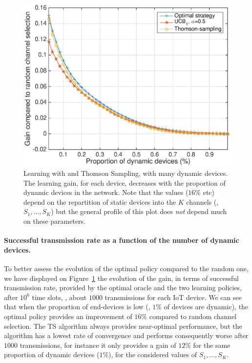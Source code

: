 \begin{figure}[!h]
    \centering
    \includegraphics[scale=0.80]{perf_learning.eps}
    \caption{Learning with \UCB{} and Thomson Sampling, with many dynamic devices.
        The learning gain, for each device, decreases with the proportion of dynamic devices in the network.
        Note that the values ($16\%$ etc) depend on the repartition of static devices into the $K$ channels (\ie, $S_1,\dots,S_K$) but the general profile of this plot does \emph{not} depend much on these parameters.
    }
    \label{fig:41:perf_learning}
\end{figure}


\paragraph{Successful transmission rate as a function of the number of dynamic devices.}
%
To better assess the evolution of the optimal policy compared to the random one, we have displayed on Figure~\ref{fig:41:perf_learning} the evolution of the gain, in terms of successful transmission rate, provided by the optimal oracle and the two learning policies, after $10^6$ time slots, \ie, about $1000$ transmissions for each IoT device.
We can see that when the proportion of end-devices is low (\eg, $1\%$ of devices are dynamic), the optimal policy provides an improvement of $16\%$ compared to random channel selection.
The TS algorithm always provides near-optimal performance, but the \UCB{} algorithm has a lowest rate of convergence and performs consequently worse after $1000$ transmissions, for instance it only provides a gain of $12\%$ for the same proportion of dynamic devices ($1\%$),
for the considered values of $S_1,\dots,S_K$.

